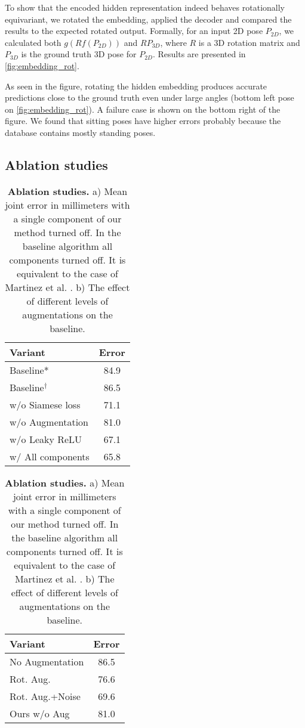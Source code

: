 \documentclass[preprint]{elsarticle}
\begin{document}
To show that the encoded hidden representation indeed behaves rotationally equivariant, we rotated the embedding, applied the decoder and compared the results to the expected rotated output. Formally, for an input 2D pose $P_{2D}$, we calculated both $g(Rf(P_{2D}))$ and $RP_{3D}$, where $R$ is a 3D rotation matrix and $P_{3D}$ is the ground truth 3D pose for $P_{2D}$. Results are presented in \autoref{fig:embedding_rot}. 

As seen in the figure, rotating the hidden embedding produces accurate predictions close to the ground truth even under large angles (bottom left pose on \autoref{fig:embedding_rot}). A failure case is shown on the bottom right of the figure. We found that sitting poses have higher errors probably because the database contains mostly standing poses.

\subsection{Ablation studies}

\begin{table}[ht]
\centering
\begin{subtable}[t]{.45\columnwidth}
\centering
    \begin{tabular}[t]{lc}
    \hline
    Variant & Error \\
    \hline
    Baseline* & 84.9 \\
    Baseline$^\dagger$ & 86.5 \\
    \hline
    w/o Siamese loss & 71.1  \\
    w/o Augmentation & 81.0 \\
    w/o Leaky ReLU & 67.1 \\
    \hline
    w/ All components & 65.8 \\
    \hline
    \end{tabular}
    \caption{Error of our method with components turned off. *Results from \cite{fang2018posegrammar}. $^\dagger$~Results of our implementation.}
\end{subtable}
\hspace{0.5cm}
\begin{subtable}[t]{.45\columnwidth}
\centering
    \begin{tabular}[t]{lc}
    \hline
    Variant & Error \\
    \hline
    No Augmentation & 86.5 \\
    Rot. Aug. & 76.6 \\
    Rot. Aug.+Noise & 69.6 \\
    \hline
    Ours w/o Aug & 81.0 \\
    \hline
    \end{tabular}
    \vspace{0.6cm}
    \caption{Error of the Baseline method with different augmentations}
\end{subtable}
\caption{\textbf{Ablation studies.} a) Mean joint error in millimeters with a single component of our method turned off. In the baseline algorithm  all components turned off. It is equivalent to the case of Martinez et al. \cite{3dbaseline}. b) The effect of different levels of augmentations on the baseline.} \label{tbl:ablation} 
\end{table}
\end{document}
